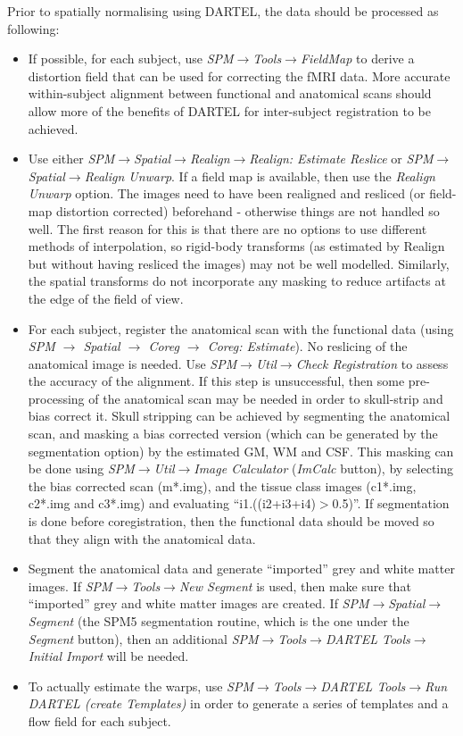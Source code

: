 Prior to spatially normalising using DARTEL, the data should be processed as following:
\begin{itemize}
\item{If possible, for each subject, use \emph{SPM$\rightarrow$Tools$\rightarrow$FieldMap} to derive a distortion field that can be used for correcting the fMRI data.
More accurate within-subject alignment between functional and anatomical scans should allow more of the benefits of DARTEL for inter-subject registration to be achieved.}
\item{Use either \emph{SPM$\rightarrow$Spatial$\rightarrow$Realign$\rightarrow$Realign: Estimate Reslice} or \emph{SPM$\rightarrow$Spatial$\rightarrow$Realign Unwarp}.  If a field map is available, then use the \emph{Realign Unwarp} option.
The images need to have been realigned and resliced (or field-map distortion corrected) beforehand - otherwise things are not handled so well.  The first reason for this is that there are no options to use different methods of interpolation, so rigid-body transforms (as estimated by Realign but without having resliced the images) may not be well modelled.  Similarly, the spatial transforms do not incorporate any masking to reduce artifacts at the edge of the field of view.}
\item{For each subject, register the anatomical scan with the functional data (using \emph{SPM $\rightarrow$ Spatial $\rightarrow$ Coreg $\rightarrow$ Coreg: Estimate}).  No reslicing of the anatomical image is needed.
Use \emph{SPM$\rightarrow$Util$\rightarrow$Check Registration} to assess the accuracy of the alignment.
If this step is unsuccessful, then some pre-processing of the anatomical scan may be needed in order to skull-strip and bias correct it.
Skull stripping can be achieved by segmenting the anatomical scan, and masking a bias corrected version (which can be generated by the segmentation option) by the estimated GM, WM and CSF.  This masking can be done using \emph{SPM$\rightarrow$Util$\rightarrow$Image Calculator} (\emph{ImCalc} button), by selecting the bias corrected scan (m*.img), and the tissue class images (c1*.img, c2*.img and c3*.img) and evaluating ``i1.\*((i2+i3+i4)$>$0.5)''.
If segmentation is done before coregistration, then the functional data should be moved so that they align with the anatomical data.}
\item{Segment the anatomical data and generate ``imported'' grey and white matter images.
If \emph{SPM$\rightarrow$Tools$\rightarrow$New Segment} is used, then make sure that ``imported'' grey and white matter images are created.
If \emph{SPM$\rightarrow$Spatial$\rightarrow$Segment} (the SPM5 segmentation routine, which is the one under the \emph{Segment} button), then an additional \emph{SPM$\rightarrow$Tools$\rightarrow$DARTEL Tools$\rightarrow$Initial Import} will be needed.}
\item{To actually estimate the warps, use \emph{SPM$\rightarrow$Tools$\rightarrow$DARTEL Tools$\rightarrow$Run DARTEL (create Templates)} in order to generate a series of templates and a flow field for each subject.}
\end{itemize}

